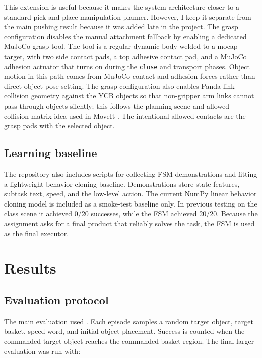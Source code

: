 \documentclass{article}
\begin{document}
This extension is useful because it makes the system architecture closer to a standard pick-and-place manipulation planner. However, I keep it separate from the main pushing result because it was added late in the project. The grasp configuration disables the manual attachment fallback by enabling a dedicated MuJoCo grasp tool. The tool is a regular dynamic body welded to a mocap target, with two side contact pads, a top adhesive contact pad, and a MuJoCo adhesion actuator that turns on during the \texttt{close} and transport phases. Object motion in this path comes from MuJoCo contact and adhesion forces rather than direct object pose setting. The grasp configuration also enables Panda link collision geometry against the YCB objects so that non-gripper arm links cannot pass through objects silently; this follows the planning-scene and allowed-collision-matrix idea used in MoveIt \cite{moveitcollision}. The intentional allowed contacts are the grasp pads with the selected object.

\subsection{Learning baseline}

The repository also includes scripts for collecting FSM demonstrations and fitting a lightweight behavior cloning baseline. Demonstrations store state features, subtask text, speed, and the low-level action. The current NumPy linear behavior cloning model is included as a smoke-test baseline only. In previous testing on the class scene it achieved 0/20 successes, while the FSM achieved 20/20. Because the assignment asks for a final product that reliably solves the task, the FSM is used as the final executor.

\section{Results}

\subsection{Evaluation protocol}

The main evaluation used . Each episode samples a random target object, target basket, speed word, and initial object placement. Success is counted when the commanded target object reaches the commanded basket region. The final larger evaluation was run with:
\end{document}
